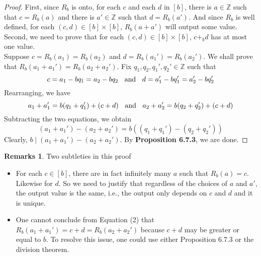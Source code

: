 \documentclass[14pt]{article}
\theoremstyle{definition}
\newtheorem*{remark}{Remarks}
\begin{document}
\begin{proof}
    First, since $R_b$ is onto, for each $c$ and each $d$ in $[b]$, there is $a\in \mathbb{Z} $ such that $c=R_b(a)$ and there is $a'\in \mathbb{Z} $ such that $d=R_b(a')$. And since $R_b$ is well defined, for each $(c,d)\in [b]\times[b]$, $R_b(a+a')$ will output some value.\\ 
    Second, we need to prove that for each $(c,d)\in [b]\times [b]$, $c+_bd$ has at most one value.\\
    Suppose $c=R_b(a_1)=R_b(a_2)$ and $d=R_b(a_1')=R_b(a_2')$. We shall prove that $R_b(a_1+a_1')=R_b(a_2+a_2')$. Fix $q_1,q_2, q_1', q_2'\in \mathbb{Z}$ such that 
    \begin{equation}
        c=a_1-bq_1=a_2-bq_2 \hspace{2mm} \text{ and } \hspace{2mm} d=a_1'-bq_1'=a_2'-bq_2' 
    \end{equation}
    Rearranging, we have
    \begin{equation}
            a_1+a_1'=b(q_1+q_1')+(c+d) \hspace{2mm} \text{ and } \hspace{2mm} a_2+a_2'=b(q_2+q_2')+(c+d)
    \end{equation}
    Subtracting the two equations, we obtain
    \begin{equation}
      ( a_1+a_1')-(a_2+a_2')=b((q_1+q_1')-(q_2+q_2'))
    \end{equation}
    Clearly, $b\mid ( a_1+a_1')-(a_2+a_2')$. By \textbf{Proposition 6.7.3}, we are done.

\end{proof}
\begin{remark}Two subtleties in this proof
\begin{itemize}
    \item  For each $c\in[b]$, there are in fact infinitely many $a$ such that $R_b(a)=c$. Likewise for $d$. So we need to justify that regardless of the choices of $a$ and $a'$, the output value is the same, i.e., the output only depends on $c$ and $d$ and it is unique.
    \item One cannot conclude from Equation (2) that $R_b(a_1+a_1')=c+d=R_b(a_2+a_2')$ because $c+d$ may be greater or equal to $b$. To resolve this issue, one could use either Proposition 6.7.3 or the division theorem.
\end{itemize}
   
\end{remark}
\end{document}
